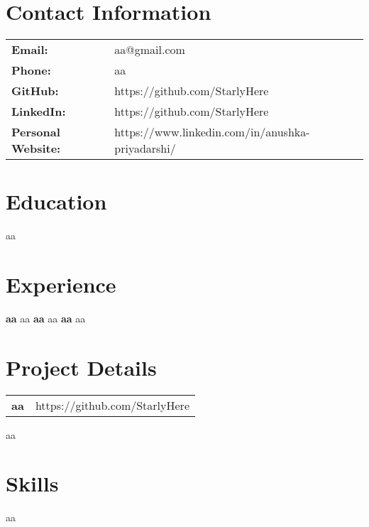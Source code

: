 \documentclass{article}
\begin{document}
\begin{center}
\end{center}

\section*{Contact Information}
\vspace*{-1em}
\noindent\hrulefill %
\newline
\begin{tabular}{@{}ll}
\textbf{Email:} & aa@gmail.com \\
\textbf{Phone:} & aa \\
\textbf{GitHub:} & https://github.com/StarlyHere \\
\textbf{LinkedIn:} & https://github.com/StarlyHere \\
\textbf{Personal Website:} & https://www.linkedin.com/in/anushka-priyadarshi/ \\
\end{tabular}

\section*{Education}
\vspace*{-1em}
\noindent\hrulefill %
\newline
aa

\section*{Experience}
\vspace*{-1em}
\noindent\hrulefill %
\newline
\textbf{aa}
\newline
aa
\vspace{1em} %
\newline
\textbf{aa}
\newline
aa
\vspace{1em} %
\newline
\textbf{aa}
\newline
aa

\section*{Project Details}
\vspace*{-1em}
\noindent\hrulefill %
\newline
\begin{tabular}{@{}>{\raggedright\arraybackslash}p{} >{\raggedleft\arraybackslash}p{}@{}}
\textbf{aa} & {https://github.com/StarlyHere} \\
\end{tabular}
\newline
aa

\section*{Skills}
\vspace*{-1em}
\noindent\hrulefill %
\newline
aa
\end{document}
